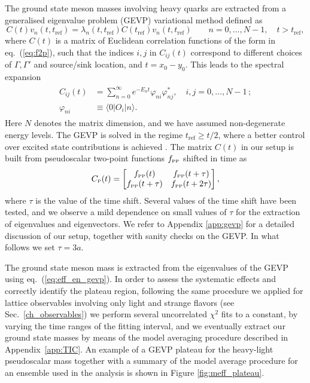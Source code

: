 The ground state meson masses involving heavy quarks are extracted from a generalised eigenvalue problem (GEVP) variational method defined as 
\begin{equation}\label{eq:gevp_sec3}
 	C(t) v_n(t,t_{\mathrm{ref}}) = \lambda_n(t,t_{\mathrm{ref}}) C(t_{\mathrm{ref}})v_n(t,t_{\mathrm{ref}}) \qquad n=0,\ldots,N-1 , \quad t>t_{\mathrm{ref}},
\end{equation}
where $C(t)$ is a matrix of Euclidean correlation functions of the form in eq.~(\ref{eq:f2p}), such that the indices $i,j$ in $C_{ij}(t)$ correspond to different choices of $\Gamma,\Gamma'$ and source/sink location, and $t=x_0-y_0$. This leads to the spectral expansion
\begin{gather}
\begin{split}
 	C_{ij}(t) &= \sum_{n=0}^{\infty} e^{-E_n t}\varphi_{ni} \varphi_{nj}^*, \quad i,j=0,\ldots, N-1 \,;\\
 \varphi_{ni} &\equiv \langle0|O_i|n\rangle.
\end{split}
\end{gather}
Here $N$ denotes the matrix dimension, and we have assumed non-degenerate energy levels. The GEVP  is solved in the regime  $t_{\mathrm{ref}} \geq t/2$, where a better control over excited state contributions is achieved \cite{Blossier:2009kd}.  The matrix $C(t)$ in our setup is built from pseudoscalar two-point functions $f_{\rm\scriptscriptstyle PP}$ shifted in time as
\begin{equation}
 	C_{\rm\scriptscriptstyle P}(t) = \bigg[\begin{matrix}
 		f_{\rm\scriptscriptstyle PP}(t)  &  f_{\rm\scriptscriptstyle PP}(t+\tau)
 		\\
 		f_{\rm\scriptscriptstyle PP}(t+\tau)  & f_{\rm\scriptscriptstyle PP}(t+2\tau)
 	\end{matrix}\bigg] \,,
\label{eq:gevp_matrix}
\end{equation}
where $\tau$ is the value of the time shift. Several values of the time shift have been tested, and we observe a mild dependence on small values of $\tau$ for the extraction of eigenvalues and eigenvectors. We refer to Appendix \ref{app:gevp} for a detailed discussion of our setup, together with sanity checks on the GEVP. In what follows we set $\tau=3a$.
  
The ground state meson mass is extracted from the eigenvalues of the GEVP using eq.~(\ref{eq:eff_en_gevp}). 
In order to assess the systematic effects and correctly identify the plateau region, following the same procedure we applied for lattice observables involving only light and strange flavors (see Sec.~\ref{ch_observables}) we perform several uncorrelated $\chi^2$ fits to a constant, by varying the time ranges of the fitting interval, and we eventually extract our ground state masses by means of the model averaging procedure described in Appendix~\ref{app:TIC}. An example of a GEVP plateau for the heavy-light pseudoscalar mass together with a summary of the model average procedure for an ensemble used in the analysis is shown in Figure \ref{fig:meff_plateau}. 
  
